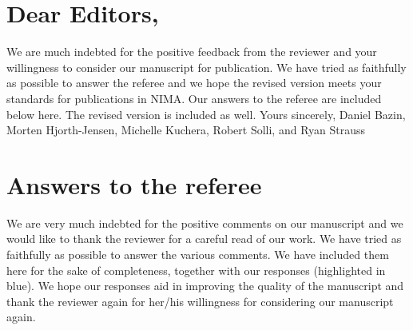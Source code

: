 \documentclass[12pt]{article}
\begin{document}
\section*{Dear Editors,}

We are much indebted for the positive feedback from the reviewer and your willingness to consider our manuscript for publication.
We have tried as faithfully as possible to answer the referee and we hope the revised version meets your standards for publications in NIMA.\newline
Our answers to the referee are included below here. The revised version is included as well.\newline
Yours sincerely,\newline
Daniel Bazin, Morten Hjorth-Jensen, Michelle Kuchera, Robert Solli, and Ryan Strauss

\section*{Answers to the referee}

We are very much indebted for the positive comments on our manuscript and we would like to  thank the reviewer for a careful read of our work. We have tried as faithfully as possible to answer the various comments. We have included them here for the sake of completeness, together with our responses
(highlighted in blue). We hope our responses  aid in improving the quality of the manuscript and thank the reviewer again for her/his willingness for considering our manuscript again.
\end{document}
